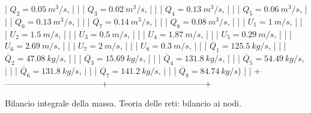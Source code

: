 \documentclass[letterpaper,10pt,italian]{jupyterBook}
\begin{document}
| \(Q_2 = 0.05\ m^3/s\),              |                                   |
| \(Q_3 = 0.02\  m^3/s\),             |                                   |
| \(Q_4 = 0.13\ m^3/s\),              |                                   |
| \(Q_5 = 0.06\ m^3/s\),              |                                   |
| \(Q_6 = 0.13\  m^3/s\),             |                                   |
| \(Q_7 = 0.14\ m^3/s\),              |                                   |
| \(Q_8 = 0.08\ m^3/s\),              |                                   |
| \(U_1 = 1   \ m/s\),                |                                   |
| \(U_2 = 1.5\  m/s\),                |                                   |
| \(U_3 = 0.5\   m/s\),               |                                   |
| \(U_4 = 1.87\ m/s\),                |                                   |
| \(U_5 = 0.29\ m/s\),                |                                   |
| \(U_6 = 2.69\  m/s\),               |                                   |
| \(U_7 = 2   \ m/s\),                |                                   |
| \(U_8 = 0.3\  m/s\),                |                                   |
| \(\overline{Q}_1 = 125.5\  kg/s\),  |                                   |
| \(\overline{Q}_2 = 47.08\  kg/s\),  |                                   |
| \(\overline{Q}_3 = 15.69\  kg/s\),  |                                   |
| \(\overline{Q}_4 = 131.8\  kg/s\),  |                                   |
| \(\overline{Q}_5 = 54.49\  kg/s\),  |                                   |
| \(\overline{Q}_6 = 131.8\  kg/s\),  |                                   |
| \(\overline{Q}_7 = 141.2\  kg/s\),  |                                   |
| \(\overline{Q}_8 = 84.74\  kg/s\))  |                                   |
+———————————–+———————————–+

\sphinxAtStartPar
Bilancio integrale della massa. Teoria delle reti: bilancio ai nodi.
\end{document}
